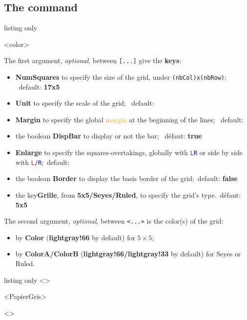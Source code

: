 \documentclass[a4paper]{article}
\newcommand\Cle[1]{{\bfseries\sffamily\textlangle #1\textrangle}}
\begin{document}
\subsection{The command}

\begin{PresentationCode}{listing only}

\DispGrid[keys]<color>
\end{PresentationCode}

The first argument, \textit{optional}, between \texttt{[...]} give the \Cle{keys}:

\begin{itemize}
	\item \Cle{NumSquares} to specify the size of the grid, under \texttt{(nbCol)x(nbRow)}; \hfill~default: \Cle{17x5}
	\item \Cle{Unit} to specify the scale of the grid; \hfill~default: \Cle{1}
	\item \Cle{Margin} to specify the global \textcolor{orange}{margin} at the beginning of the lines; \hfill~default: \Cle{0}
	\item the boolean \Cle{DispBar} to display or not the bar; \hfill~défaut: \Cle{true}
	\item \Cle{Enlarge} to specify the squares-overtakings, globally with \texttt{\textcolor{red}{L}\textcolor{blue}{R}} or side by side with \texttt{\textcolor{red}{L}/\textcolor{blue}{R}};\hfill~default: \Cle{0}
	\item the boolean \Cle{Border} to display the basis border of the grid;\hfill~default: \Cle{false}
	\item the key\Cle{Grille}, from \Cle{5x5/Seyes/Ruled}, to specify the grid's type.\hfill~défaut: \Cle{5x5}
\end{itemize}

The second argument, \textit{optional}, between \texttt{<...>} is the color(s) of the grid:

\begin{itemize}
	\item by \Cle{Color} (\Cle{lightgray!66} by default) for $5\times5$;
	\item by \Cle{ColorA/ColorB} (\Cle{lightgray!66/lightgray!33} by default) for Seyes or Ruled.
\end{itemize}

\medskip

\begin{PresentationCode}{listing only}
\DispGrid[NumSquares=18x4,Grid=Seyes,DispBar=false]<\ColSeyes>

\DispGrid[NumSquares=36x8,Enlarge=3/3]<PapierGris>

\begin{center}
	\DispGrid[NumSquares=12x3,Grid=Ruled,Margin=2]<\ColRuled>
\end{center}
\end{PresentationCode}
\end{document}
